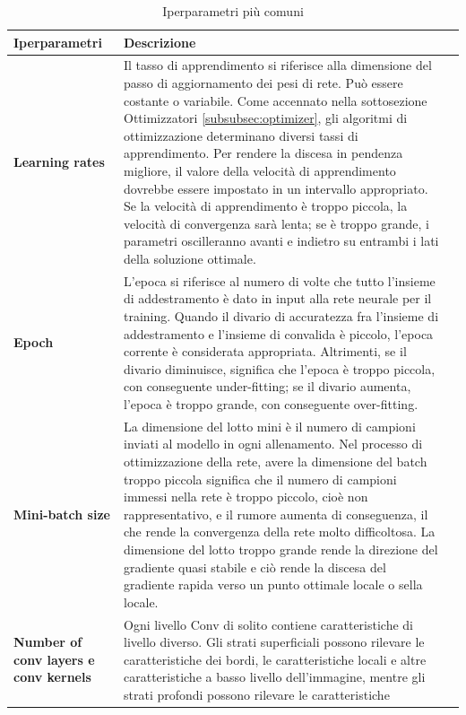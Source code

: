 \begin{table}[hpbt!]
    \centering
    \caption{Iperparametri più comuni}
    \footnotesize
    \begin{tabular}{>{\bfseries}lp{}l}
    \toprule
        Iperparametri & Descrizione \\
        \midrule
         Learning rates &  Il tasso di apprendimento si riferisce alla dimensione del passo di aggiornamento dei pesi di
         rete. Può essere costante o variabile. Come accennato nella sottosezione Ottimizzatori
         \ref{subsubsec:optimizer}, gli algoritmi di ottimizzazione determinano diversi tassi di apprendimento. Per
         rendere la discesa in pendenza migliore, il valore della velocità di apprendimento dovrebbe essere impostato 
         in un intervallo appropriato. Se la velocità di apprendimento è troppo piccola, la velocità di convergenza 
         sarà lenta; se è troppo grande, i parametri oscilleranno avanti e indietro su entrambi i lati della soluzione
         ottimale. \\
         \midrule
         Epoch & L'epoca si riferisce al numero di volte che tutto l'insieme di addestramento è dato in input 
         alla rete neurale per il training. Quando il divario di accuratezza fra l'insieme di addestramento e l'insieme
         di convalida è piccolo, l'epoca corrente è considerata appropriata. Altrimenti, se il divario diminuisce,
         significa che l'epoca è troppo piccola, con conseguente under-fitting; se il divario aumenta, l'epoca è 
         troppo grande, con conseguente over-fitting.\\  
         \midrule
         Mini-batch size & La dimensione del lotto mini è il numero di campioni inviati al modello in ogni allenamento.
         Nel processo di ottimizzazione della rete, avere la dimensione del batch troppo piccola significa che il numero
         di campioni immessi nella rete è troppo piccolo, cioè non rappresentativo, e il rumore aumenta di conseguenza,
         il che rende la convergenza della rete molto difficoltosa. La dimensione del lotto troppo grande rende la
         direzione del gradiente quasi stabile e ciò rende la discesa del gradiente rapida verso un punto ottimale
         locale o sella locale.\\
         \midrule
         Number of conv layers e conv kernels & Ogni livello Conv di solito contiene caratteristiche di livello diverso.
         Gli strati superficiali possono rilevare le caratteristiche dei bordi, le caratteristiche locali e altre
         caratteristiche a basso livello dell'immagine, mentre gli strati profondi possono rilevare le caratteristiche

\end{tabular}
\end{table}
